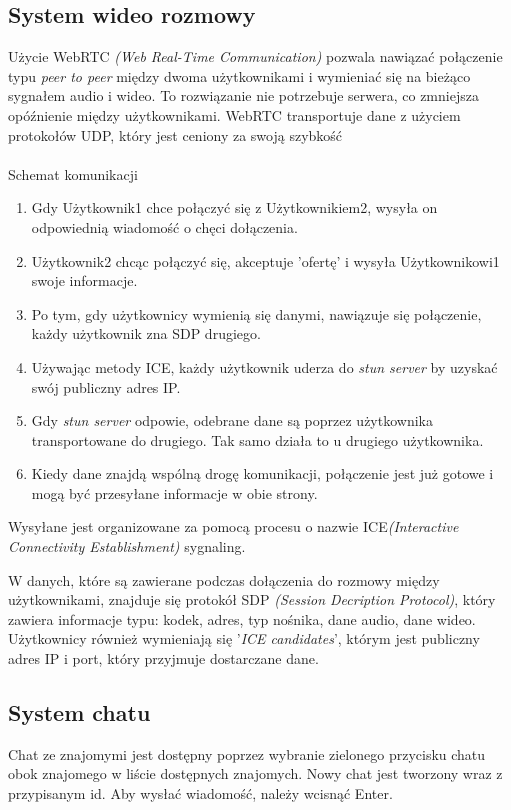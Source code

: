 \documentclass{article}
\begin{document}
\subsection{System wideo rozmowy}
Użycie WebRTC \textit{(Web Real-Time Communication)} pozwala nawiązać połączenie typu \textit{peer to peer} między dwoma użytkownikami i wymieniać się na bieżąco sygnałem audio i wideo. To rozwiązanie nie potrzebuje serwera, co zmniejsza opóźnienie między użytkownikami. WebRTC transportuje dane z użyciem protokołów UDP, który jest ceniony za swoją szybkość
\\\\
 Schemat komunikacji
 \begin{enumerate}
     \item Gdy Użytkownik1 chce połączyć się z Użytkownikiem2, wysyła on odpowiednią wiadomość o chęci dołączenia.
     \item  Użytkownik2 chcąc połączyć się, akceptuje 'ofertę' i wysyła Użytkownikowi1 swoje informacje.
     \item  Po tym, gdy użytkownicy wymienią się danymi, nawiązuje się połączenie, każdy użytkownik zna SDP drugiego.
     \item Używając metody ICE, każdy użytkownik uderza do \textit{stun server} by uzyskać swój publiczny adres IP.
     \item Gdy \textit{stun server} odpowie, odebrane dane są poprzez użytkownika transportowane do drugiego. Tak samo działa to u drugiego użytkownika.
     \item Kiedy dane znajdą wspólną drogę komunikacji, połączenie jest już gotowe i mogą być przesyłane informacje w obie strony.
 \end{enumerate}

Wysyłane jest organizowane za pomocą procesu o nazwie ICE\textit{(Interactive Connectivity Establishment)} sygnaling.

 W danych, które są zawierane podczas dołączenia do rozmowy między użytkownikami, znajduje się protokół SDP \textit{(Session Decription Protocol)}, który zawiera informacje typu: kodek, adres, typ nośnika, dane audio, dane wideo. Użytkownicy również wymieniają się '\textit{ICE candidates}', którym jest publiczny adres IP i port, który przyjmuje dostarczane dane.

\subsection{System chatu}

Chat ze znajomymi jest dostępny poprzez wybranie zielonego przycisku chatu obok znajomego w liście dostępnych znajomych. Nowy chat jest tworzony wraz z przypisanym id. Aby wysłać wiadomość, należy wcisnąć Enter.
\end{document}
